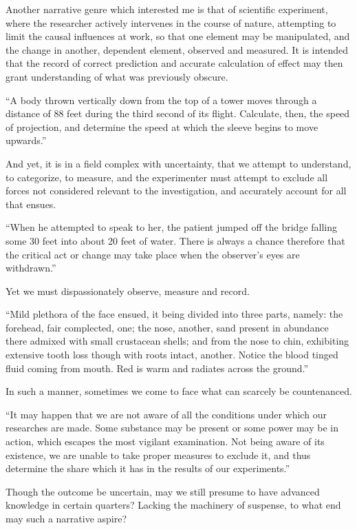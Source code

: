 \documentclass[
]{memoir}
\begin{document}
Another narrative genre which interested me is that of scientific
experiment, where the researcher actively intervenes in the course of
nature, attempting to limit the causal influences at work, so that one
element may be manipulated, and the change in another, dependent
element, observed and measured. It is intended that the record of
correct prediction and accurate calculation of effect may then grant
understanding of what was previously obscure.

``A body thrown vertically down from the top of a tower moves through a
distance of 88 feet during the third second of its flight. Calculate,
then, the speed of projection, and determine the speed at which the
sleeve begins to move upwards.''

And yet, it is in a field complex with uncertainty, that we attempt to
understand, to categorize, to measure, and the experimenter must attempt
to exclude all forces not considered relevant to the investigation, and
accurately account for all that ensues.

``When he attempted to speak to her, the patient jumped off the bridge
falling some 30 feet into about 20 feet of water. There is always a
chance therefore that the critical act or change may take place when the
observer's eyes are withdrawn.''

Yet we must dispassionately observe, measure and record.

``Mild plethora of the face ensued, it being divided into three parts,
namely: the forehead, fair complected, one; the nose, another, sand
present in abundance there admixed with small crustacean shells; and
from the nose to chin, exhibiting extensive tooth loss though with roots
intact, another. Notice the blood tinged fluid coming from mouth. Red is
warm and radiates across the ground.''

In such a manner, sometimes we come to face what can scarcely be
countenanced.

``It may happen that we are not aware of all the conditions under which
our researches are made. Some substance may be present or some power may
be in action, which escapes the most vigilant examination. Not being
aware of its existence, we are unable to take proper measures to exclude
it, and thus determine the share which it has in the results of our
experiments.''

Though the outcome be uncertain, may we still presume to have advanced
knowledge in certain quarters? Lacking the machinery of suspense, to
what end may such a narrative aspire?
\end{document}
